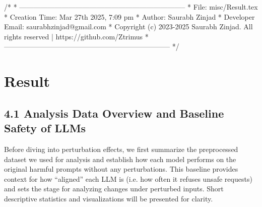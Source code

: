 /*
 * -----------------------------------------------------------------------
 * File: misc/Result.tex
 * Creation Time: Mar 27th 2025, 7:09 pm
 * Author: Saurabh Zinjad
 * Developer Email: saurabhzinjad@gmail.com
 * Copyright (c) 2023-2025 Saurabh Zinjad. All rights reserved | https://github.com/Ztrimus
 * -----------------------------------------------------------------------
 */

\chapter{Result}

\section{4.1 Analysis Data Overview and Baseline Safety of LLMs}
Before diving into perturbation effects, we first summarize the preprocessed dataset we used for analysis and establish how each model performs on the original harmful prompts without any perturbations. This baseline provides context for how “aligned” each LLM is (i.e. how often it refuses unsafe requests) and sets the stage for analyzing changes under perturbed inputs. Short descriptive statistics and visualizations will be presented for clarity.

